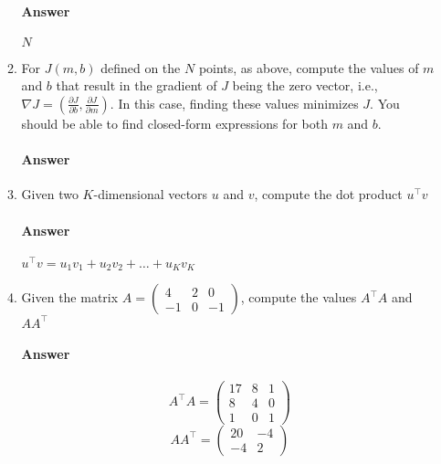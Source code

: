 \documentclass[12pt]{article}
\begin{document}
\begin{enumerate}
\begin{enumerate}
  \paragraph{Answer} $N$

  \item For $J(m,b)$ defined on the $N$ points, as above, compute the values of $m$ and 
        $b$ that result in the gradient of $J$ being the zero vector, i.e., 
        $\nabla J = (\frac{\partial J}{\partial b}, \frac{\partial J}{\partial m})$.
        In this case, finding these values minimizes $J$. You should be able to find 
        closed-form expressions for both $m$ and $b$.\\
  \vspace{-2.5em}
  \paragraph{Answer}

  \item Given two $K$-dimensional vectors $u$ and $v$, compute the dot product $u^{\top}v$\\
  \vspace{-2.5em}
  \paragraph{Answer} $u^{\top}v = u_1v_1 + u_2v_2 + \dots + u_Kv_K$

  \item Given the matrix $A = 
        \begin{pmatrix}
          4   & 2 & 0 \\
          -1  & 0 & -1
        \end{pmatrix}$, compute the values $A^{\top}A$ and $AA^{\top}$\\
  \vspace{-2.5em}
  \paragraph{Answer} $$A^{\top}A = \begin{pmatrix}
                                    17 & 8 & 1\\
                                    8  & 4 & 0\\
                                    1 & 0 & 1
                                  \end{pmatrix}$$
                    $$AA^{\top} = \begin{pmatrix}
                                    20 & -4\\
                                    -4 & 2
                                  \end{pmatrix}$$


\end{enumerate}
\end{enumerate}
\end{document}
